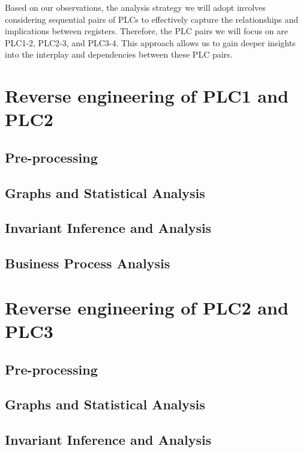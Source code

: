 \bigskip
Based on our observations, the analysis strategy we will adopt involves considering sequential pairs of PLCs to effectively capture the relationships and implications between registers. Therefore, the PLC pairs we will focus on are PLC1-2, PLC2-3, and PLC3-4. This approach allows us to gain deeper insights into the interplay and dependencies between these PLC pairs.

\section{Reverse engineering of PLC1 and PLC2}
\label{sec:6_P1P2_analysis}

\subsection{Pre-processing}
\label{subsec:6_P1P2_preprocessing}

\subsection{Graphs and Statistical Analysis}
\label{subsec:6_P1P2_graphs}

\subsection{Invariant Inference and Analysis}
\label{subsec:6_P1P2_invariants}

\subsection{Business Process Analysis}
\label{subsec:6_P1P2_bpa}

\section{Reverse engineering of PLC2 and PLC3}
\label{sec:6_P2P3_analysis}

\subsection{Pre-processing}
\label{subsec:6_P2P3_preprocessing}

\subsection{Graphs and Statistical Analysis}
\label{subsec:6_P2P3_graphs}

\subsection{Invariant Inference and Analysis}
\label{subsec:6_P2P3_invariants}


